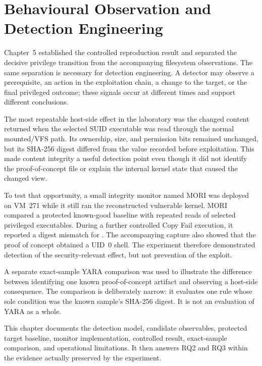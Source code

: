 \section{Behavioural Observation and Detection Engineering}
\label{sec:behavioural-detection}

\graphicspath{{../evidence/}{evidence/}}

Chapter~5 established the controlled reproduction result and separated the
decisive privilege transition from the accompanying filesystem observations.
The same separation is necessary for detection engineering. A detector may
observe a prerequisite, an action in the exploitation chain, a change to the
target, or the final privileged outcome; these signals occur at different
times and support different conclusions.

The most repeatable host-side effect in the laboratory was the changed content
returned when the selected SUID executable was read through the normal
mounted/VFS path. Its ownership, size, and permission bits remained unchanged,
but its SHA-256 digest differed from the value recorded before exploitation.
This made content integrity a useful detection point even though it did not
identify the proof-of-concept file or explain the internal kernel state that
caused the changed view.

To test that opportunity, a small integrity monitor named MORI was deployed on
VM~271 while it still ran the reconstructed vulnerable kernel. MORI compared a
protected known-good baseline with repeated reads of selected privileged
executables. During a further controlled Copy Fail execution, it reported a
digest mismatch for . The accompanying capture also showed
that the proof of concept obtained a UID~0 shell. The experiment therefore
demonstrated detection of the security-relevant effect, but not prevention of
the exploit.

A separate exact-sample YARA comparison was used to illustrate the difference
between identifying one known proof-of-concept artifact and observing a
host-side consequence. The comparison is deliberately narrow: it evaluates one
rule whose sole condition was the known sample's SHA-256 digest. It is not an
evaluation of YARA as a whole.

This chapter documents the detection model, candidate observables, protected
target baseline, monitor implementation, controlled result, exact-sample
comparison, and operational limitations. It then answers RQ2 and RQ3 within the
evidence actually preserved by the experiment.

